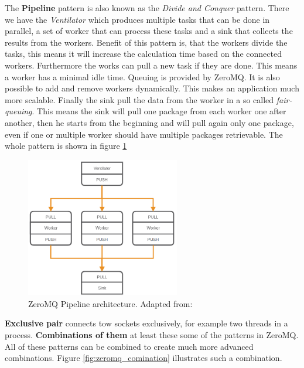 \newpage

The \textbf{Pipeline} pattern is also known as the \textit{Divide and Conquer} pattern.
There we have the \textit{Ventilator} which produces multiple tasks that can be done in parallel, a set of worker that can process these tasks and a sink that collects the results from the workers.\autocite{ZeroMQ:Guide}
Benefit of this pattern is, that the workers divide the tasks, this means it will increase the calculation time based on the connected workers.
Furthermore the works can pull a new task if they are done.
This means a worker has a minimal idle time.
Queuing is provided by ZeroMQ.
It is also possible to add and remove workers dynamically.
This makes an application much more scalable.
Finally the sink pull the data from the worker in a so called \textit{fair-queuing}.
This means the sink will pull one package from each worker one after another, then he starts from the beginning and will pull again only one package, even if one or multiple worker should have multiple packages retrievable.
The whole pattern is shown in figure \ref{fig:zeromq_pipeline}\newline

\begin{figure}[H]
    \centering
    \includegraphics[width=0.6\textwidth]{resources/images/zeromq-vernitlator.png}
    \caption[ZeroMQ Pipeline architecture]{ZeroMQ Pipeline architecture. Adapted from: \autocite{ZeroMQ:Guide}}
    \label{fig:zeromq_pipeline}
\end{figure}

\textbf{Exclusive pair} connects tow sockets exclusively, for example two threads in a process.\autocite{ZeroMQ:Guide}
\newline
\textbf{Combinations of them} at least these some of the patterns in ZeroMQ.
All of these patterns can be combined to create much more advanced combinations.
Figure \ref{fig:zeromq_comination} illustrates such a combination.

